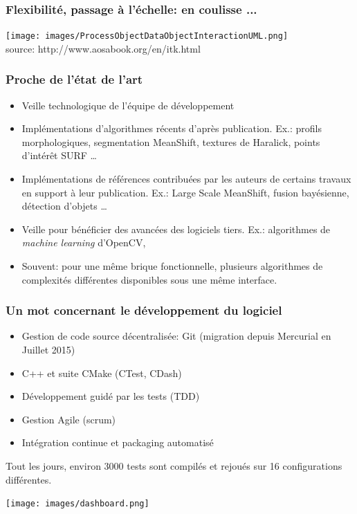 \documentclass[8pt]{beamer}
\begin{document}
\begin{frame}
\frametitle{Flexibilité, passage à l'échelle: en coulisse ...}
\begin{center}
\texttt{[image: images/ProcessObjectDataObjectInteractionUML.png]}\\
\tiny{source: http://www.aosabook.org/en/itk.html}
\end{center}
\end{frame}

\begin{frame}
\frametitle{Proche de l'état de l'art}
\begin{itemize}
\item Veille technologique de l'équipe de développement
\item Implémentations d'algorithmes récents d'après publication. Ex.: profils morphologiques, segmentation MeanShift, textures de Haralick, points d'intérêt SURF \ldots
\item Implémentations de références contribuées par les auteurs de certains travaux en support à leur publication. Ex.: Large Scale MeanShift, fusion bayésienne, détection d'objets \ldots
\item Veille pour bénéficier des avancées des logiciels tiers. Ex.: algorithmes de \textit{machine learning} d'OpenCV,
\item Souvent: pour une même brique fonctionnelle, plusieurs algorithmes de complexités différentes disponibles sous une même interface.
\end{itemize}
\end{frame}


\begin{frame}
\frametitle{Un mot concernant le développement du logiciel}
\vspace{-0.5cm}
\begin{itemize}
\item Gestion de code source décentralisée: Git (migration depuis Mercurial en
  Juillet 2015)
\item C++ et suite CMake (CTest, CDash)
\item Développement guidé par les tests (TDD)
\item Gestion Agile (scrum)
\item Intégration continue et packaging automatisé
\end{itemize}
Tout les jours, environ 3000 tests sont compilés et rejoués sur 16
configurations différentes.
\begin{center}
\texttt{[image: images/dashboard.png]}
\end{center}
\end{frame}
\end{document}
